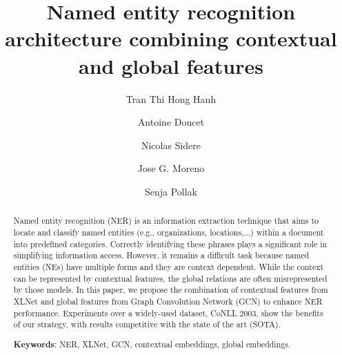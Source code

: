 \documentclass[runningheads]{llncs}
\begin{document}
\author{Tran Thi Hong Hanh  \and
Antoine Doucet \and
Nicolas Sidere \and
Jose G. Moreno \and
Senja Pollak}






\title{Named entity recognition architecture combining contextual and global features}

\maketitle


\begin{abstract}
Named entity recognition (NER) is an information extraction technique that aims to locate and classify named entities (e.g., organizations, locations,...) within a document into predefined categories. Correctly identifying these phrases plays a significant role in simplifying information access.
However, it remains a difficult task because named entities (NEs) have multiple forms and they are context dependent. While the context can be represented by contextual features, the global relations are often misrepresented by those models. In this paper, we propose the combination of contextual features from XLNet and global features from Graph Convolution Network (GCN) to enhance NER performance. Experiments over a widely-used dataset, CoNLL 2003, show the benefits of our strategy, with results competitive with the state of the art (SOTA). 

\textbf{Keywords}: NER, XLNet, GCN, contextual embeddings, global embeddings.
\end{abstract}
\vspace{-0.2cm}
\end{document}
